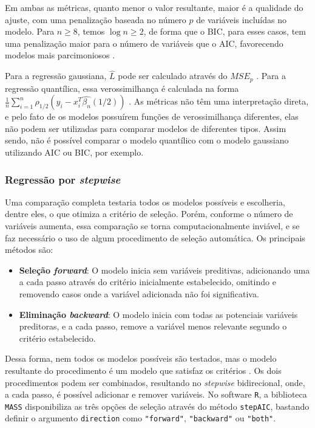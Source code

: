Em ambas as métricas, quanto menor o valor resultante, maior é a qualidade do ajuste, com uma penalização baseada no número $p$ de variáveis incluídas no modelo. Para $n \geq 8$, temos $\log n \geq 2$, de forma que o BIC, para esses casos, tem uma penalização maior para o número de variáveis que o AIC, favorecendo modelos mais parcimoniosos \cite{kutner}.

Para a regressão gaussiana, $\hat{L}$ pode ser calculado através do $MSE_p$ \cite{montgomerylra}. Para a regressão quantílica, essa verossimilhança é calculada na forma $\frac{1}{n}\displaystyle\sum_{i = 1} ^ {n} \rho_{1/2}(y_i - x_i^{T}\hat{\beta_n}(1/2))$ \cite{koenker2005}. As métricas não têm uma interpretação direta, e pelo fato de os modelos possuírem funções de verossimilhança diferentes, elas não podem ser utilizadas para comparar modelos de diferentes tipos. Assim sendo, não é possível comparar o modelo quantílico com o modelo gaussiano utilizando AIC ou BIC, por exemplo.

\subsubsection{Regressão por \textit{stepwise}}
Uma comparação completa testaria todos os modelos possíveis e escolheria, dentre eles, o que otimiza a critério de seleção. Porém, conforme o número de variáveis aumenta, essa comparação se torna computacionalmente inviável, e se faz necessário o uso de algum procedimento de seleção automática. Os principais métodos são:

\begin{itemize}
    \item \textbf{Seleção \textit{forward}}: O modelo inicia sem variáveis preditivas, adicionando uma a cada passo através do critério inicialmente estabelecido, omitindo e removendo casos onde a variável adicionada não foi significativa.
    \item \textbf{Eliminação \textit{backward}}: O modelo inicia com todas as potenciais variáveis preditoras, e a cada passo, remove a variável menos relevante segundo o critério estabelecido.
\end{itemize}

Dessa forma, nem todos os modelos possíveis são testados, mas o modelo resultante do procedimento é um modelo que satisfaz os critérios \cite{kutner}. Os dois procedimentos podem ser combinados, resultando no \textit{stepwise} bidirecional, onde, a cada passo, é possível adicionar e remover variáveis. No software \texttt{R}, a biblioteca \texttt{MASS} disponibiliza as três opções de seleção através do método \texttt{stepAIC}, bastando definir o argumento \texttt{direction} como \texttt{"forward"}, \texttt{"backward"} ou \texttt{"both"}.
